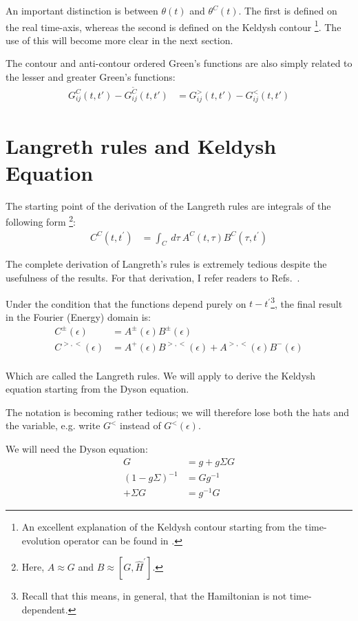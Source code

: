 An important distinction is between $\theta (t)$ and $\theta^C(t)$. The first is defined on the real time-axis, whereas the second is defined on the Keldysh contour \footnote{An excellent explanation of the Keldysh contour starting from the time-evolution operator can be found in \citet{diventra}.}. The use of this will become more clear in the next section. 

The contour and anti-contour ordered Green's functions are also simply related to the lesser and greater Green's functions:
\begin{align*}
G^C_{ij}(t,t') - G^{\tilde{C}}_{ij}(t,t') &= G^>_{ij}(t,t') - G^<_{ij}(t,t')
\end{align*}

\section{Langreth rules and Keldysh Equation}
The starting point of the derivation of the Langreth rules are integrals of the following form \footnote{Here, $A \approx G$ and $B \approx [G, \widehat{H}^\prime]$.}:
\begin{align*}
C^C(t,t^\prime) &= \int_C\:d\tau\:A^C(t,\tau) B^C (\tau, t^\prime)
\end{align*}

The complete derivation of Langreth's rules is extremely tedious despite the usefulness of the results. For that derivation, I refer readers to Refs.~\cite{mattuck,haugjauho}.
 
Under the condition that the functions depend purely on $t-t^\prime$\footnote{Recall that this means, in general, that the Hamiltonian is not time-dependent.}, the final result in the Fourier (Energy) domain is:
\begin{align*}
C^\pm (\epsilon) &= 
A^\pm (\epsilon) 
B^\pm (\epsilon) \\
C^{>,<} (\epsilon) &= 
A^+ (\epsilon) 
B^{>,<} (\epsilon) + 
A^{>,<} (\epsilon) 
B^- (\epsilon) \\
\end{align*}

Which are called the Langreth rules. We will apply to derive the Keldysh equation starting from the Dyson equation.
 
The notation is becoming rather tedious; we will therefore lose both the hats and the variable, e.g. write $G^<$ instead of $G^<(\epsilon)$.

We will need the Dyson equation:
\begin{align*}
G &= g + g\Sigma G \\
(1 - g\Sigma)^{-1} &=G  g^{-1} \\
+ \Sigma G &= g^{-1} G
\end{align*}


